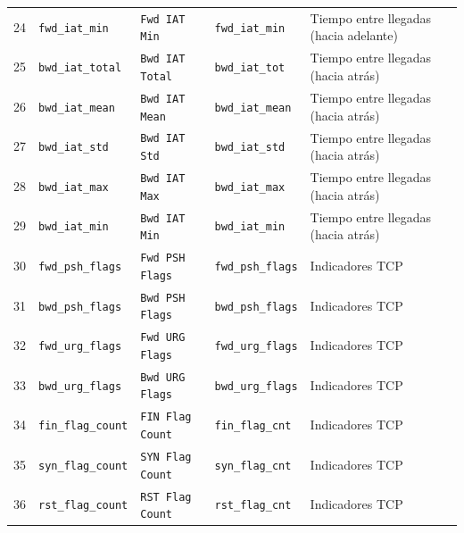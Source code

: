 \begin{landscape}
\begin{longtable}{@{}r p{4.2cm} p{4.4cm} p{4.1cm} p{4.8cm}@{}}
24 & \texttt{fwd\_\allowbreak{}iat\_\allowbreak{}min} & \texttt{Fwd IAT Min} & \texttt{fwd\_\allowbreak{}iat\_\allowbreak{}min} & Tiempo entre llegadas (hacia adelante) \\
25 & \texttt{bwd\_\allowbreak{}iat\_\allowbreak{}total} & \texttt{Bwd IAT Total} & \texttt{bwd\_\allowbreak{}iat\_\allowbreak{}tot} & Tiempo entre llegadas (hacia atrás) \\
26 & \texttt{bwd\_\allowbreak{}iat\_\allowbreak{}mean} & \texttt{Bwd IAT Mean} & \texttt{bwd\_\allowbreak{}iat\_\allowbreak{}mean} & Tiempo entre llegadas (hacia atrás) \\
27 & \texttt{bwd\_\allowbreak{}iat\_\allowbreak{}std} & \texttt{Bwd IAT Std} & \texttt{bwd\_\allowbreak{}iat\_\allowbreak{}std} & Tiempo entre llegadas (hacia atrás) \\
28 & \texttt{bwd\_\allowbreak{}iat\_\allowbreak{}max} & \texttt{Bwd IAT Max} & \texttt{bwd\_\allowbreak{}iat\_\allowbreak{}max} & Tiempo entre llegadas (hacia atrás) \\
29 & \texttt{bwd\_\allowbreak{}iat\_\allowbreak{}min} & \texttt{Bwd IAT Min} & \texttt{bwd\_\allowbreak{}iat\_\allowbreak{}min} & Tiempo entre llegadas (hacia atrás) \\
30 & \texttt{fwd\_\allowbreak{}psh\_\allowbreak{}flags} & \texttt{Fwd PSH Flags} & \texttt{fwd\_\allowbreak{}psh\_\allowbreak{}flags} & Indicadores TCP \\
31 & \texttt{bwd\_\allowbreak{}psh\_\allowbreak{}flags} & \texttt{Bwd PSH Flags} & \texttt{bwd\_\allowbreak{}psh\_\allowbreak{}flags} & Indicadores TCP \\
32 & \texttt{fwd\_\allowbreak{}urg\_\allowbreak{}flags} & \texttt{Fwd URG Flags} & \texttt{fwd\_\allowbreak{}urg\_\allowbreak{}flags} & Indicadores TCP \\
33 & \texttt{bwd\_\allowbreak{}urg\_\allowbreak{}flags} & \texttt{Bwd URG Flags} & \texttt{bwd\_\allowbreak{}urg\_\allowbreak{}flags} & Indicadores TCP \\
34 & \texttt{fin\_\allowbreak{}flag\_\allowbreak{}count} & \texttt{FIN Flag Count} & \texttt{fin\_\allowbreak{}flag\_\allowbreak{}cnt} & Indicadores TCP \\
35 & \texttt{syn\_\allowbreak{}flag\_\allowbreak{}count} & \texttt{SYN Flag Count} & \texttt{syn\_\allowbreak{}flag\_\allowbreak{}cnt} & Indicadores TCP \\
36 & \texttt{rst\_\allowbreak{}flag\_\allowbreak{}count} & \texttt{RST Flag Count} & \texttt{rst\_\allowbreak{}flag\_\allowbreak{}cnt} & Indicadores TCP \\

\end{longtable}
\end{landscape}

